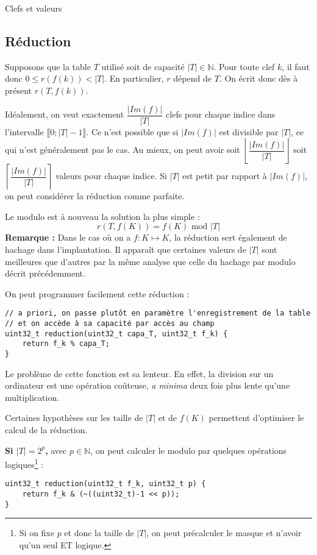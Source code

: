 \documentclass[../../../main.tex]{subfiles}
\begin{document}
\begin{definition}{Clefs et valeurs}
\subsection{Réduction}
Supposons que la table $T$ utilisé soit de capacité $|T|\in\mathbb{N}$. Pour toute clef $k$, il faut donc $0\leq r(f(k)) < |T|$. En particulier, $r$ dépend de $T$. On écrit donc dès à présent $r(T, f(k))$.

Idéalement, on veut exactement $\dfrac{|Im(f)|}{|T|}$ clefs pour chaque indice dans l'intervalle $\llbracket 0; |T| - 1\rrbracket$. Ce n'est possible que si $|Im(f)|$ est divisible par $|T|$, ce qui n'est généralement pas le cas. Au mieux, on peut avoir soit $\left\lfloor \dfrac{|Im(f)|}{|T|}\right\rfloor$ soit $\left\lceil \dfrac{|Im(f)|}{|T|}\right\rceil$ valeurs pour chaque indice. Si $|T|$ est petit par rapport à $|Im(f)|$, on peut considérer la réduction comme parfaite.

Le modulo est à nouveau la solution la plus simple :
$$r(T, f(K)) = f(K)\text{ mod }|T|$$
\textbf{Remarque :} Dans le cas où on a $f : K\mapsto K$, la réduction sert également de hachage dans l'implantation. Il apparaît que certaines valeurs de $|T|$ sont meilleures que d'autres par la même analyse que celle du hachage par modulo décrit précédemment. %

On peut programmer facilement cette réduction :
\begin{verbatim}
// a priori, on passe plutôt en paramètre l'enregistrement de la table
// et on accède à sa capacité par accès au champ
uint32_t reduction(uint32_t capa_T, uint32_t f_k) {
	return f_k % capa_T;
}
\end{verbatim}
Le problème de cette fonction est sa lenteur. En effet, la division sur un ordinateur est une opération coûteuse, \textit{a minima} deux fois plus lente qu'une multiplication.

Certaines hypothèses sur les taille de $|T|$ et de $f(K)$ permettent d'optimiser le calcul de la réduction. 

\textbf{Si $|T| = 2^p$,} avec $p\in\mathbb{N}$, on peut calculer le modulo par quelques opérations logiques\footnote{Si on fixe $p$ et donc la taille de $|T|$, on peut précalculer le masque et n'avoir qu'un seul ET logique.} :
\begin{verbatim}
uint32_t reduction(uint32_t f_k, uint32_t p) {
	return f_k & (~((uint32_t)-1 << p));
}
\end{verbatim}


\end{definition}
\end{document}
